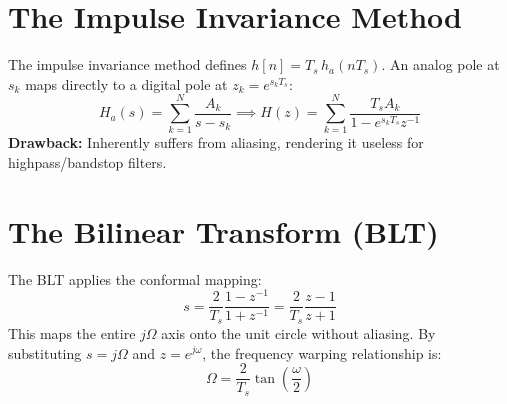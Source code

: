 \documentclass[11pt,a4paper]{article}
\begin{document}
\section{The Impulse Invariance Method}
The impulse invariance method defines $h[n] = T_s \, h_a(nT_s)$. 
An analog pole at $s_k$ maps directly to a digital pole at $z_k = e^{s_k T_s}$:
\begin{equation}
H_a(s) = \sum_{k=1}^N \frac{A_k}{s - s_k} \implies H(z) = \sum_{k=1}^N \frac{T_s A_k}{1 - e^{s_k T_s} z^{-1}}
\end{equation}
\textbf{Drawback:} Inherently suffers from aliasing, rendering it useless for highpass/bandstop filters.

\section{The Bilinear Transform (BLT)}
The BLT applies the conformal mapping:
\begin{equation}
s = \frac{2}{T_s} \frac{1 - z^{-1}}{1 + z^{-1}} = \frac{2}{T_s} \frac{z - 1}{z + 1}
\end{equation}
This maps the entire $j\Omega$ axis onto the unit circle without aliasing.
By substituting $s = j\Omega$ and $z = e^{j\omega}$, the frequency warping relationship is:
\begin{equation}
\Omega = \frac{2}{T_s} \tan\left(\frac{\omega}{2}\right)
\end{equation}
\end{document}
